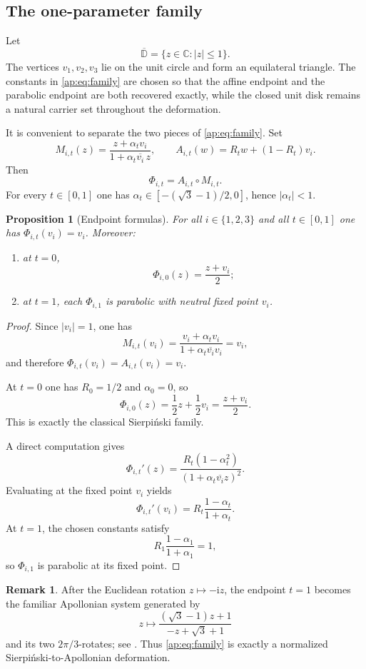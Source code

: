 \documentclass[11pt]{amsart}
\newtheorem{proposition}[proposition]{Proposition}
\theoremstyle{definition}
\newtheorem{remark}[remark]{Remark}
\newcommand{\C}{\mathbb{C}}
\newcommand{\Disk}{\overline{\mathbb{D}}}
\newcommand{\ii}{\mathrm{i}}
\begin{document}
\subsection{The one-parameter family}
Let
\[
  \Disk=\{z\in\C:|z|\le 1\}.
\]
The vertices $v_1,v_2,v_3$ lie on the unit circle and form an equilateral triangle. The constants in \eqref{ap:eq:family} are chosen so that the affine endpoint and the parabolic endpoint are both recovered exactly, while the closed unit disk remains a natural carrier set throughout the deformation.

It is convenient to separate the two pieces of \eqref{ap:eq:family}. Set
\[
  M_{i,t}(z)=\frac{z+\alpha_t v_i}{1+\alpha_t\overline{v_i}\,z},
  \qquad
  A_{i,t}(w)=R_t w+(1-R_t)v_i.
\]
Then
\[
  \Phi_{i,t}=A_{i,t}\circ M_{i,t}.
\]
For every $t\in[0,1]$ one has $\alpha_t\in[-(\sqrt 3-1)/2,0]$, hence $|\alpha_t|<1$.

\begin{proposition}[Endpoint formulas]\label{ap:prop:endpoints}
For all $i\in\{1,2,3\}$ and all $t\in[0,1]$ one has $\Phi_{i,t}(v_i)=v_i$. Moreover:
\begin{enumerate}[label=(\alph*)]
\item at $t=0$,
\[
  \Phi_{i,0}(z)=\frac{z+v_i}{2};
\]
\item at $t=1$, each $\Phi_{i,1}$ is parabolic with neutral fixed point $v_i$.
\end{enumerate}
\end{proposition}

\begin{proof}
Since $|v_i|=1$, one has
\[
  M_{i,t}(v_i)=\frac{v_i+\alpha_t v_i}{1+\alpha_t\overline{v_i}v_i}=v_i,
\]
and therefore $\Phi_{i,t}(v_i)=A_{i,t}(v_i)=v_i$.

At $t=0$ one has $R_0=1/2$ and $\alpha_0=0$, so
\[
  \Phi_{i,0}(z)=\frac{1}{2}z+\frac{1}{2}v_i=\frac{z+v_i}{2}.
\]
This is exactly the classical Sierpi\'nski family.

A direct computation gives
\begin{equation}\label{ap:eq:derivative}
  \Phi_{i,t}'(z)=\frac{R_t(1-\alpha_t^2)}{(1+\alpha_t\overline{v_i}z)^2}.
\end{equation}
Evaluating at the fixed point $v_i$ yields
\[
  \Phi_{i,t}'(v_i)=R_t\frac{1-\alpha_t}{1+\alpha_t}.
\]
At $t=1$, the chosen constants satisfy
\[
  R_1\frac{1-\alpha_1}{1+\alpha_1}=1,
\]
so $\Phi_{i,1}$ is parabolic at its fixed point.
\end{proof}

\begin{remark}
After the Euclidean rotation $z\mapsto -\ii z$, the endpoint $t=1$ becomes the familiar Apollonian system generated by
\[
  z\longmapsto \frac{(\sqrt 3-1)z+1}{-z+\sqrt 3+1}
\]
and its two $2\pi/3$-rotates; see \cite{McMullen1998,VytnovaWormell2025}. Thus \eqref{ap:eq:family} is exactly a normalized Sierpi\'nski-to-Apollonian deformation.
\end{remark}
\end{document}
